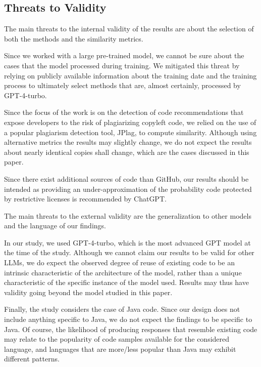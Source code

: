 \subsection{Threats to Validity}
The main threats to the internal validity of the results are about the selection of both the methods and the similarity metrics. 

Since we worked with a large pre-trained model, we cannot be sure about the cases that the model processed during training. We mitigated this threat by relying on publicly available information about the training date and the training process to ultimately select methods that are, almost certainly, processed by GPT-4-turbo. %

Since the focus of the work is on the detection of code recommendations that expose developers to the risk of plagiarizing copyleft code, we relied on the use of a popular plagiarism detection tool, JPlag, to compute similarity. Although using alternative metrics the results may slightly change, we do not expect the results about nearly identical copies shall change, which are the cases discussed in this paper.

Since there exist additional sources of code than GitHub, our results should be intended as providing an under-approximation of the probability code protected by restrictive licenses is recommended by ChatGPT.

The main threats to the external validity are the generalization to other models and the language of our findings. 

In our study, we used GPT-4-turbo, which is the most advanced GPT model at the time of the study. Although we cannot claim our results to be valid for other LLMs, we do expect the observed degree of reuse of existing code to be an intrinsic characteristic of the architecture of the model, rather than a unique characteristic of the specific instance of the model used. Results may thus have validity going beyond the model studied in this paper. 

Finally, the study considers the case of Java code. Since our design does not include anything specific to Java, we do not expect the findings to be specific to Java. Of course, the likelihood of producing responses that resemble existing code may relate to the popularity of code samples available for the considered language, and languages that are more/less popular than Java may exhibit different patterns.
